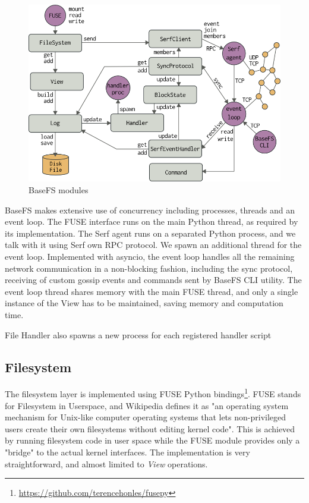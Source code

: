 \documentclass{sig-alternate}
\begin{document}
\begin{figure}[htp]
\centering
\includegraphics[width=\columnwidth]{imgs/modules.png}
\caption{BaseFS modules}
\label{fig:modules}
\end{figure}


BaseFS makes extensive use of concurrency including processes, threads and an event loop. The FUSE interface runs on the main Python thread, as required by its implementation. The Serf agent runs on a separated Python process, and we talk with it using Serf own RPC protocol. We spawn an additional thread for the event loop. Implemented with asyncio, the event loop handles all the remaining network communication in a non-blocking fashion, including the sync protocol, receiving of custom gossip events and commands sent by BaseFS CLI utility. The event loop thread shares memory with the main FUSE thread, and only a single instance of the View has to be maintained, saving memory and computation time.

File Handler also spawns a new process for each registered handler script

\subsection{Filesystem}
The filesystem layer is implemented using FUSE Python bindings\footnote{\url{https://github.com/terencehonles/fusepy}}. FUSE stands for Filesystem in Userspace, and Wikipedia defines it as "an operating system mechanism for Unix-like computer operating systems that lets non-privileged users create their own filesystems without editing kernel code". This is achieved by running filesystem code in user space while the FUSE module provides only a "bridge" to the actual kernel interfaces. The implementation is very straightforward, and almost limited to \textit{View} operations.
\end{document}
